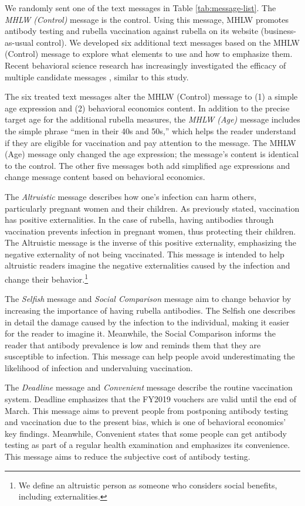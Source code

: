 \documentclass[
]{article}
\begin{document}
We randomly sent one of the text messages in Table \ref{tab:message-list}. The \emph{MHLW (Control)} message is the control. Using this message, MHLW promotes antibody testing and rubella vaccination against rubella on its website (business-as-usual control). We developed six additional text messages based on the MHLW (Control) message to explore what elements to use and how to emphasize them. Recent behavioral science research has increasingly investigated the efficacy of multiple candidate messages \citep[e.g.,][]{Dai2021, Milkman2021}, similar to this study.

The six treated text messages alter the MHLW (Control) message to (1) a simple age expression and (2) behavioral economics content. In addition to the precise target age for the additional rubella measures, the \emph{MHLW (Age)} message includes the simple phrase ``men in their 40s and 50s,'' which helps the reader understand if they are eligible for vaccination and pay attention to the message. The MHLW (Age) message only changed the age expression; the message's content is identical to the control. The other five messages both add simplified age expressions and change message content based on behavioral economics.

The \emph{Altruistic} message describes how one's infection can harm others, particularly pregnant women and their children. As previously stated, vaccination has positive externalities. In the case of rubella, having antibodies through vaccination prevents infection in pregnant women, thus protecting their children. The Altruistic message is the inverse of this positive externality, emphasizing the negative externality of not being vaccinated. This message is intended to help altruistic readers imagine the negative externalities caused by the infection and change their behavior.\footnote{We define an altruistic person as someone who considers social benefits, including externalities.}

The \emph{Selfish} message and \emph{Social Comparison} message aim to change behavior by increasing the importance of having rubella antibodies. The Selfish one describes in detail the damage caused by the infection to the individual, making it easier for the reader to imagine it. Meanwhile, the Social Comparison informs the reader that antibody prevalence is low and reminds them that they are susceptible to infection. This message can help people avoid underestimating the likelihood of infection and undervaluing vaccination.

The \emph{Deadline} message and \emph{Convenient} message describe the routine vaccination system. Deadline emphasizes that the FY2019 vouchers are valid until the end of March. This message aims to prevent people from postponing antibody testing and vaccination due to the present bias, which is one of behavioral economics' key findings. Meanwhile, Convenient states that some people can get antibody testing as part of a regular health examination and emphasizes its convenience. This message aims to reduce the subjective cost of antibody testing.
\end{document}
